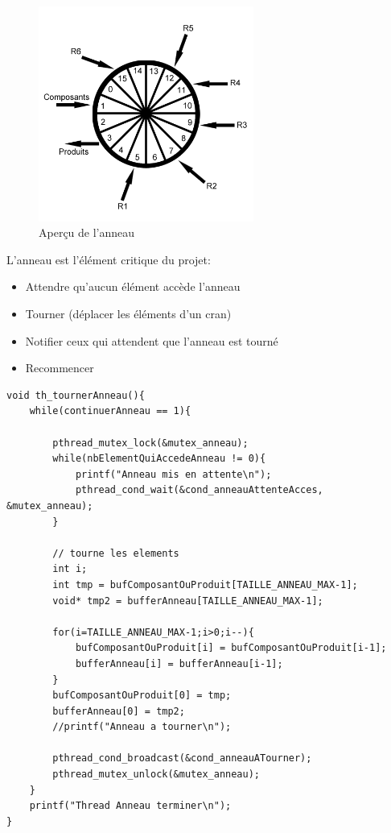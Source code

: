 \documentclass{report}
\begin{document}
\begin{figure}[H]
\center
\includegraphics[width=200pt]{chaineMontage.png}
\caption{Aperçu de l'anneau}
\label{diagSeq}
\end{figure}
L'anneau est l'élément critique du projet:
\begin{itemize}
\item Attendre qu'aucun élément accède l'anneau
\item Tourner (déplacer les éléments d'un cran)
\item Notifier ceux qui attendent que l'anneau est tourné
\item Recommencer
\end{itemize}
\begin{lstlisting}[caption=Fonction du thread de l'anneau]
void th_tournerAnneau(){
    while(continuerAnneau == 1){

        pthread_mutex_lock(&mutex_anneau);
        while(nbElementQuiAccedeAnneau != 0){
            printf("Anneau mis en attente\n");
            pthread_cond_wait(&cond_anneauAttenteAcces, &mutex_anneau);
        }
        
        // tourne les elements
        int i;
        int tmp = bufComposantOuProduit[TAILLE_ANNEAU_MAX-1];
        void* tmp2 = bufferAnneau[TAILLE_ANNEAU_MAX-1];
        
        for(i=TAILLE_ANNEAU_MAX-1;i>0;i--){
            bufComposantOuProduit[i] = bufComposantOuProduit[i-1];
            bufferAnneau[i] = bufferAnneau[i-1];
        }
        bufComposantOuProduit[0] = tmp;
        bufferAnneau[0] = tmp2;
        //printf("Anneau a tourner\n");
        
        pthread_cond_broadcast(&cond_anneauATourner);
        pthread_mutex_unlock(&mutex_anneau);
    }
    printf("Thread Anneau terminer\n");
}
\end{lstlisting}
\end{document}

